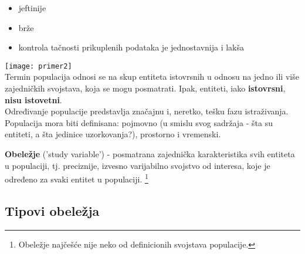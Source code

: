 \documentclass[10pt,a4paper,]{article}
\begin{document}
\begin{itemize}
	\item jeftinije 
	\item brže
	\item kontrola tačnosti prikuplenih podataka je jednostavnija
	 i lakša
\end{itemize}

\texttt{[image: primer2]}
\\[0.25cm]

Termin populacija odnosi se na skup entiteta istovrsnih u odnosu 
na jedno ili više zajedničkih svojstava, koja se mogu posmatrati. 
Ipak, entiteti, iako \textbf{istovrsni}, \textbf{nisu istovetni}.
\\ 
Određivanje populacije 
predstavlja značajnu i, neretko, tešku fazu istraživanja. Populacija 
mora biti definisana: pojmovno (u smislu svog sadržaja - šta su 
entiteti, a šta jedinice uzorkovanja?), prostorno i vremenski.

\textbf{Obeležje} ('study variable') - posmatrana zajednička 
karakteristika 
svih entiteta u populaciji, tj. preciznije, izvesno varijabilno 
svojstvo od interesa, koje je određeno za svaki entitet u populaciji.
\footnote{Obeležje najčešće nije neko od definicionih svojstava
populacije.}

\subsection{Tipovi obeležja}
\end{document}
